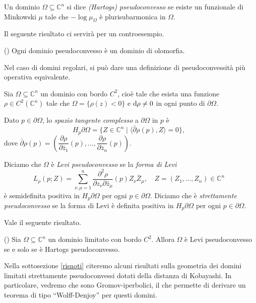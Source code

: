 \begin{defn}
    Un dominio $\Omega \subseteq \mathbb{C}^n$ si dice \textit{(Hartogs) pseudoconvesso} se esiste un funzionale di Minkowski $\mu$ tale che $-\log\mu_{\Omega}$ è plurisubarmonica in $\Omega$.
\end{defn}

 Il seguente risultato ci servirà per un controesempio.

 \begin{thm}
    (\cite[Theorem 5.1.2]{Kr}) Ogni dominio pseudoconvesso è un dominio di olomorfia.
 \end{thm}

Nel caso di domini regolari, si può dare una definizione di pseudoconvessità più operativa equivalente.

\begin{defn}
    Sia $\Omega \subseteq \mathbb{C}^n$ un dominio con bordo $C^2$, cioè tale che esista una funzione $\rho \in C^2(\mathbb{C}^n)$ tale che $\Omega=\{\rho(z)<0\}$ e $\mathop{}\!\mathrm{d}\rho\not=0$ in ogni punto di $\partial\Omega$.
    
    Dato $p \in \partial\Omega$, lo \textit{spazio tangente complesso} a $\partial\Omega$ in $p$ è
    $$H_p\partial\Omega=\{Z \in \mathbb{C}^n \mid \langle \bar{\partial}\rho(p),Z\rangle=0\},$$
    dove $\bar{\partial}\rho(p)=\left(\dfrac{\partial\rho}{\partial\bar{z}_1}(p),\dots,\dfrac{\partial\rho}{\partial\bar{z}_n}(p)\right)$.

    Diciamo che $\Omega$ è \textit{Levi pseudoconvesso} se la \textit{forma di Levi}
    $$L_{\rho}(p;Z)=\sum_{\nu,\mu=1}^n \frac{\partial^2\rho}{\partial z_\nu\partial\bar{z}_\mu}(p)Z_\nu\bar{Z}_\mu, \quad Z=(Z_1,\dots,Z_n) \in \mathbb{C}^n$$
      è semidefinita positiva in $H_p\partial\Omega$ per ogni $p \in \partial\Omega$. Diciamo che è \textit{strettamente pseudoconvesso} se la forma di Levi è definita positiva in $H_p\partial\Omega$ per ogni $p \in \partial\Omega$.
\end{defn}

Vale il seguente risultato.
\begin{thm}
    (\cite[Theorem 3.3.5]{Kr}) Sia $\Omega \subseteq \mathbb{C}^n$ un dominio limitato con bordo $C^2$. Allora $\Omega$ è Levi pseudoconvesso se e solo se è Hartogs pseudoconvesso.
\end{thm}

Nella sottosezione \ref{risnoti} citeremo alcuni risultati sulla geometria dei domini limitati strettamente pseudoconvessi dotati della distanza di Kobayashi. In particolare, vedremo che sono Gromov-iperbolici, il che permette di derivare un teorema di tipo ``Wolff-Denjoy'' per questi domini.

